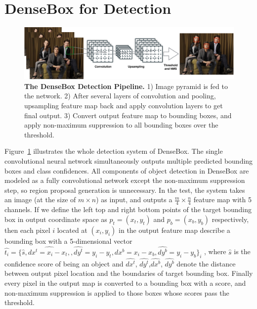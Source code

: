 \section{DenseBox for Detection }
\label{sec:model} 

\begin{figure}[!hbtp]
\centering
\includegraphics[scale=0.39]{figures/figure1-crop.pdf}
\caption{\textbf{The DenseBox Detection Pipeline.} 1) Image pyramid is fed to the network. 2) After several layers of convolution and pooling, upsampling feature map back and apply convolution layers to get final output. 3) Convert output feature map to bounding boxes, and apply non-maximum suppression to all bounding boxes over the threshold. }
\label{fig:fig_overview}
\end{figure}

Figure~\ref{fig:fig_overview} illustrates the whole detection system of DenseBox. The single convolutional neural network simultaneously outputs multiple predicted bounding boxes and class confidences. All components of object detection in DenseBox are modeled as a fully convolutional network except the non-maximum suppression step, so region proposal generation is unnecessary. In the test, the system takes an image (at the size of $m\times n$) as input, and outputs a $ \frac{m}{4} \times \frac{n}{4} $ feature map with 5 channels.
If we define the left top and right bottom points of the target bounding box in output coordinate space as $ p_t = (x_t, y_t)$ and $ p_b = (x_b, y_b)$ respectively, then each pixel $i$ located at $(x_i, y_i)$ in the output feature map describe a bounding box with a 5-dimensional vector $\hat{t_i } = \{ \hat{s }, \hat{dx^{t}= x_i - x_t,},\hat{dy^{t}} = y_i - y_t,\hat{dx^{b}}= x_i - x_b,\hat{dy^{b}}= y_i - y_b \}_i$ , where $\hat{s }$ is the confidence score of being an object and $\hat{dx^{t}}$, $\hat{dy^{t}}$,$\hat{dx^{b}}$, $\hat{dy^{b}}$ denote the distance between output pixel location and the boundaries of target bounding box. Finally every pixel in the output map is converted to a bounding box with a score, and non-maximum suppression is applied to those boxes whose scores pass the threshold. 

